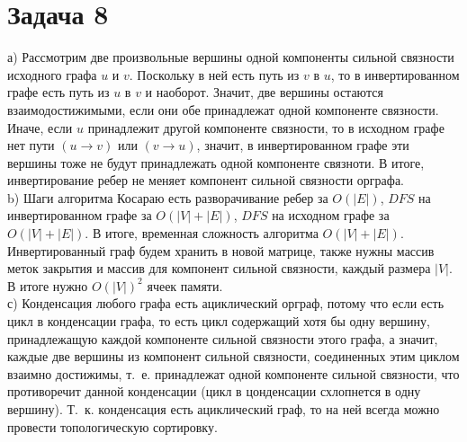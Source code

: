 \documentclass[a4paper,12pt]{article} %
\begin{document}
\section*{Задача 8}
а) Рассмотрим две произвольные вершины одной  компоненты сильной связности исходного графа $u$ и $v$. Поскольку в ней есть путь из $v$ в $u$, то в инвертированном графе есть путь из $u$ в $v$ и наоборот. Значит, две вершины остаются взаимодостижимыми, если они обе принадлежат одной компоненте связности. Иначе, если $u$ принадлежит другой компоненте связности, то в исходном графе нет пути $(u\rightarrow v)$ или $(v\rightarrow u)$, значит, в инвертированном графе эти вершины тоже не будут принадлежать одной компоненте связноти. В итоге, инвертирование ребер не меняет компонент сильной связности орграфа.\\

b) Шаги алгоритма Косараю есть разворачивание ребер за $O(|E|)$, $DFS$ на инвертированном графе за $O(|V|+|E|)$, $DFS$ на исходном графе за $O(|V|+|E|)$. В итоге, временная сложность алгоритма $O(|V|+|E|)$. Инвертированный граф будем хранить в новой матрице, также нужны массив меток закрытия и массив для компонент сильной связности, каждый размера $|V|$. В итоге нужно $O(|V|)^2$ ячеек памяти.\\

с) Конденсация любого графа есть ациклический орграф, потому что если есть цикл в конденсации графа, то есть цикл содержащий хотя бы одну вершину, принадлежащую каждой компоненте сильной связности этого графа, а значит,  каждые две вершины из компонент сильной связности, соединенных этим циклом взаимно достижимы, т.~е. принадлежат одной компоненте сильной связности, что противоречит данной конденсации (цикл в цонденсации схлопнется в одну вершину). Т.~к. конденсация есть ациклический граф, то на ней всегда можно провести топологическую сортировку.\\

          
 
 
 
\end{document}
